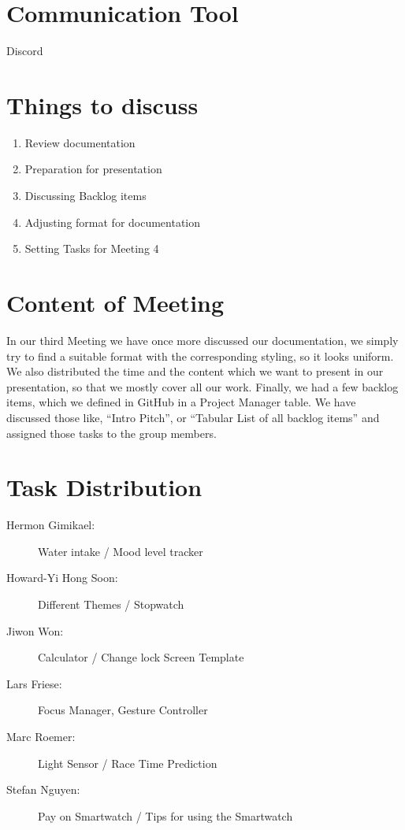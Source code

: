 \documentclass{article}
\begin{document}
\section*{Communication Tool}
Discord

\section*{Things to discuss}
\begin{enumerate}
    \item Review documentation
    \item Preparation for presentation
    \item Discussing Backlog items
    \item Adjusting format for documentation
    \item Setting Tasks for Meeting 4
\end{enumerate}

\section*{Content of Meeting}
In our third Meeting we have once more discussed our documentation, we simply try to find a suitable format with the corresponding styling, so it looks uniform. We also distributed the time and the content which we want to present in our presentation, so that we mostly cover all our work. Finally, we had a few backlog items, which we defined in GitHub in a Project Manager table. We have discussed those like, “Intro Pitch”, or “Tabular List of all backlog items” and assigned those tasks to the group members. 

\section*{Task Distribution}
\begin{description}
    \item[Hermon Gimikael:] Water intake / Mood level tracker 
    \item[Howard-Yi Hong Soon:] Different Themes / Stopwatch
    \item[Jiwon Won:] Calculator / Change lock Screen Template
    \item[Lars Friese:] Focus Manager, Gesture Controller
    \item[Marc Roemer:] Light Sensor / Race Time Prediction 
    \item[Stefan Nguyen:] Pay on Smartwatch / Tips for using the Smartwatch
\end{description}
\end{document}
